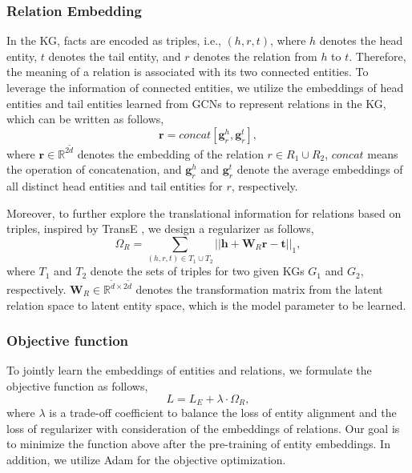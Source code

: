 \documentclass[letterpaper]{article} %
\begin{document}
\subsubsection{Relation Embedding}
In the KG, facts are encoded as triples, i.e., $(h,r,t)$, where $h$
denotes the head entity, $t$ denotes the tail entity, and $r$
denotes the relation from $h$ to $t$. Therefore, the meaning of a
relation is associated with its two connected entities. To leverage
the information of connected entities, we utilize the embeddings of
head entities and tail entities learned from GCNs to represent
relations in the KG, which can be written as follows,
\begin{equation}
\bm{r} =  concat[\bm{g}^h_r, \bm{g}^t_r],
\end{equation}
where $\bm{r} \in \mathbb{R}^{2\tilde{d}}$ denotes the embedding of
the relation $r \in R_1 \cup R_2$, $concat$ means the operation of concatenation, and
$\bm{g}^h_r$ and $\bm{g}^t_r$ denote the average embeddings of all
distinct head entities and tail entities for $r$, respectively.

Moreover, to further explore the translational information for
relations based on triples, inspired by TransE
\cite{bordes2013translating}, we design a regularizer as follows,
\begin{equation}
\Omega_R = \sum_{(h,r,t) \in T_1 \cup T_2} ||
\bm{h}+\bm{W}_{R}\bm{r}-\bm{t} ||_1,
\end{equation}
where $T_1$ and $T_2$ denote the sets of triples for two given KGs
$G_1$ and $G_2$, respectively. $\bm{W}_{R} \in \mathbb{R}^{\tilde{d}
\times 2\tilde{d}}$ denotes the transformation matrix from the
latent relation space to latent entity space, which is the model
parameter to be learned. %

\subsubsection{Objective function}
To jointly learn the embeddings of entities and relations, we
formulate the objective function as follows,
\begin{equation}
L = L_E + \lambda \cdot \Omega_R, \label{loss_all}
\end{equation}
where $\lambda$ is a trade-off coefficient to balance the loss of
entity alignment and the loss of regularizer with consideration of
the embeddings of relations. Our goal is to minimize the function
above after the pre-training of entity embeddings. In addition, we
utilize Adam \cite{kingma2015adam} for the objective optimization.
\end{document}
